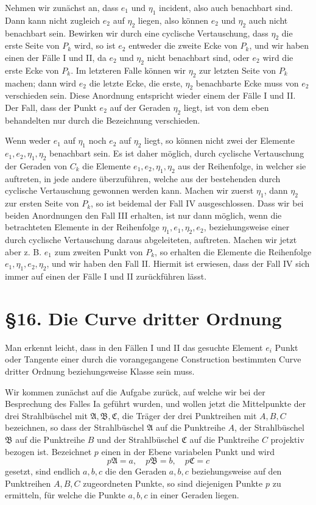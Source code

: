 \documentclass[11pt]{article}
\begin{document}
Nehmen wir zunächst an, dass $e_1$ und $\eta_1$ incident, also auch benachbart sind. Dann kann nicht zugleich $e_2$ auf $\eta_2$ liegen, also können $e_2$ und $\eta_2$ auch nicht benachbart sein. Bewirken wir durch eine cyclische Vertauschung, dass $\eta_2$ die erste Seite von $P_k$ wird, so ist $e_2$ entweder die zweite Ecke von $P_k$, und wir haben einen der Fälle I und II, da $e_2$ und $\eta_2$ nicht benachbart sind, oder $e_2$ wird die erste Ecke von $P_k$. Im letzteren Falle können wir $\eta_2$ zur letzten Seite von $P_k$ machen; dann wird $e_2$ die letzte Ecke, die erste, $\eta_2$ benachbarte Ecke muss von $e_2$ verschieden sein. Diese Anordnung entspricht wieder einem der Fälle I und II. Der Fall, dass der Punkt $e_2$ auf der Geraden $\eta_2$ liegt, ist von dem eben behandelten nur durch die Bezeichnung verschieden.

Wenn weder $e_1$ auf $\eta_1$ noch $e_2$ auf $\eta_2$ liegt, so können nicht zwei der Elemente $e_1,e_2,\eta_1,\eta_2$ benachbart sein. Es ist daher möglich, durch cyclische Vertauschung der Geraden von $C_k$ die Elemente $e_1,e_2,\eta_1,\eta_2$ aus der Reihenfolge, in welcher sie auftreten, in jede andere überzuführen, welche aus der bestehenden durch cyclische Vertauschung gewonnen werden kann. Machen wir zuerst $\eta_1$, dann $\eta_2$ zur ersten Seite von $P_k$, so ist beidemal der Fall IV ausgeschlossen. Dass wir bei beiden Anordnungen den Fall III erhalten, ist nur dann möglich, wenn die betrachteten Elemente in der Reihenfolge $\eta_1,e_1,\eta_2,e_2$, beziehungsweise einer durch cyclische Vertauschung daraus abgeleiteten, auftreten. Machen wir jetzt aber z. B. $e_1$ zum zweiten Punkt von $P_k$, so erhalten die Elemente die Reihenfolge $e_1,\eta_1,e_2,\eta_2$, und wir haben den Fall II. Hiermit ist erwiesen, dass der Fall IV sich immer auf einen der Fälle I und II zurückführen lässt.

\section*{\S 16. Die Curve dritter Ordnung}
Man erkennt leicht, dass in den Fällen I und II das gesuchte Element $e_i$ Punkt oder Tangente einer durch die vorangegangene Construction bestimmten Curve dritter Ordnung beziehungsweise Klasse sein muss.

Wir kommen zunächst auf die Aufgabe zurück, auf welche wir bei der Besprechung des Falles Ia geführt wurden, und wollen jetzt die Mittelpunkte der drei Strahlbüschel mit $\mathfrak A,\mathfrak B,\mathfrak C$, die Träger der drei Punktreihen mit $A,B,C$ bezeichnen, so dass der Strahlbüschel $\mathfrak A$ auf die Punktreihe $A$, der Strahlbüschel $\mathfrak B$ auf die Punktreihe $B$ und der Strahlbüschel $\mathfrak C$ auf die Punktreihe $C$ projektiv bezogen ist. Bezeichnet $p$ einen in der Ebene variabelen Punkt und wird
\[
p\mathfrak A=a,
\quad p\mathfrak B=b,
\quad p\mathfrak C=c
\]
gesetzt, sind endlich $a,b,c$ die den Geraden $a,b,c$ beziehungsweise auf den Punktreihen $A,B,C$ zugeordneten Punkte, so sind diejenigen Punkte $p$ zu ermitteln, für welche die Punkte $a,b,c$ in einer Geraden liegen.
\end{document}
